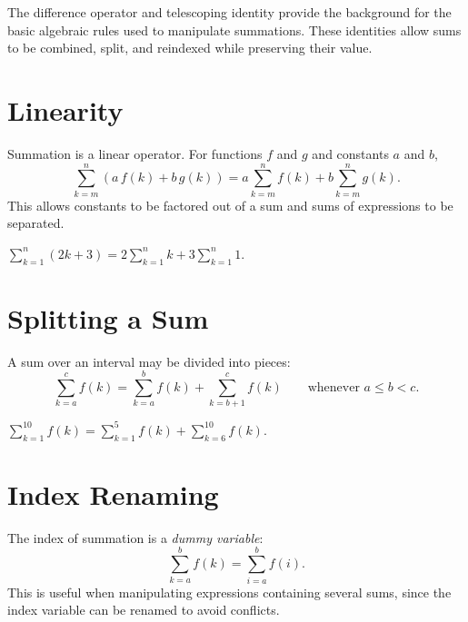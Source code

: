 
\begin{remark*}[Orientation]
The difference operator and telescoping identity provide the background for
the basic algebraic rules used to manipulate summations.
These identities allow sums to be combined, split, and reindexed while
preserving their value.
\end{remark*}

\section*{Linearity}

\begin{remark*}[Linearity]
Summation is a linear operator. For functions \(f\) and \(g\) and
constants \(a\) and \(b\),
\[
\sum_{k=m}^{n} (a\,f(k) + b\,g(k))
=
a \sum_{k=m}^{n} f(k)
+
b \sum_{k=m}^{n} g(k).
\]
This allows constants to be factored out of a sum and sums of expressions
to be separated.
\end{remark*}

\begin{example*}
\(\displaystyle\sum_{k=1}^{n} (2k + 3)
= 2\sum_{k=1}^{n} k + 3\sum_{k=1}^{n} 1.\)
\end{example*}

\section*{Splitting a Sum}

\begin{remark*}
A sum over an interval may be divided into pieces:
\[
\sum_{k=a}^{c} f(k)
=
\sum_{k=a}^{b} f(k)
+
\sum_{k=b+1}^{c} f(k)
\qquad \text{whenever } a \le b < c.
\]
\end{remark*}

\begin{example*}
\(\displaystyle\sum_{k=1}^{10} f(k)
= \sum_{k=1}^{5} f(k) + \sum_{k=6}^{10} f(k).\)
\end{example*}

\section*{Index Renaming}

\begin{remark*}
The index of summation is a \emph{dummy variable}:
\[
\sum_{k=a}^{b} f(k)
=
\sum_{i=a}^{b} f(i).
\]
This is useful when manipulating expressions containing several sums,
since the index variable can be renamed to avoid conflicts.
\end{remark*}

